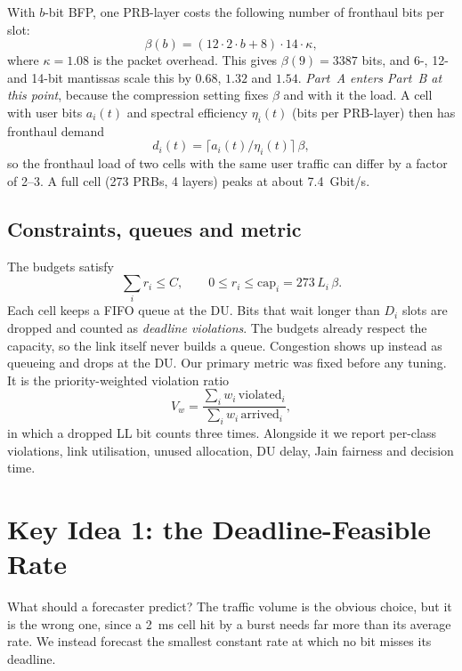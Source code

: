 With $b$-bit BFP, one PRB-layer costs the following number of fronthaul bits per slot:
\begin{equation}
  \beta(b) = (12\cdot 2\cdot b + 8)\cdot 14\cdot\kappa,
  \label{eq:beta}
\end{equation}
where $\kappa = 1.08$ is the packet overhead. This gives $\beta(9) = 3387$ bits, and 6-, 12- and 14-bit mantissas scale this by $0.68$, $1.32$ and $1.54$. \emph{Part~A enters Part~B at this point}, because the compression setting fixes $\beta$ and with it the load. A cell with user bits $a_i(t)$ and spectral efficiency $\eta_i(t)$ (bits per PRB-layer) then has fronthaul demand
\begin{equation}
  d_i(t) = \lceil a_i(t)/\eta_i(t)\rceil\,\beta,
\end{equation}
so the fronthaul load of two cells with the same user traffic can differ by a factor of 2--3. A full cell (273 PRBs, 4 layers) peaks at about 7.4~Gbit/s.

\subsection{Constraints, queues and metric}

The budgets satisfy
\begin{equation}
  \sum_i r_i \le C, \qquad 0 \le r_i \le \mathrm{cap}_i = 273\,L_i\,\beta .
\end{equation}
Each cell keeps a FIFO queue at the DU. Bits that wait longer than $D_i$ slots are dropped and counted as \emph{deadline violations}. The budgets already respect the capacity, so the link itself never builds a queue. Congestion shows up instead as queueing and drops at the DU. Our primary metric was fixed before any tuning. It is the priority-weighted violation ratio
\begin{equation}
  V_w = \frac{\sum_i w_i\,\mathrm{violated}_i}{\sum_i w_i\,\mathrm{arrived}_i},
\end{equation}
in which a dropped LL bit counts three times. Alongside it we report per-class violations, link utilisation, unused allocation, DU delay, Jain fairness and decision time.

\section{Key Idea 1: the Deadline-Feasible Rate}
\label{sec:rstar}

What should a forecaster predict? The traffic volume is the obvious choice, but it is the wrong one, since a 2~ms cell hit by a burst needs far more than its average rate. We instead forecast the smallest constant rate at which no bit misses its deadline.

